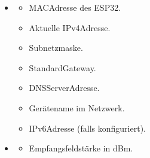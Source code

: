 \documentclass[letterpaper,10pt,english]{sphinxmanual}
\begin{document}
\sphinxAtStartPar
{}
\begin{itemize}
\item {} \begin{description}
\begin{itemize}
\item {} 
\sphinxAtStartPar
{}  \textendash{} MAC\sphinxhyphen{}Adresse des ESP32.

\item {} 
\sphinxAtStartPar
{}  \textendash{} Aktuelle IPv4\sphinxhyphen{}Adresse.

\item {} 
\sphinxAtStartPar
{}  \textendash{} Subnetzmaske.

\item {} 
\sphinxAtStartPar
{}  \textendash{} Standard\sphinxhyphen{}Gateway.

\item {} 
\sphinxAtStartPar
{}  \textendash{} DNS\sphinxhyphen{}Server\sphinxhyphen{}Adresse.

\item {} 
\sphinxAtStartPar
{}  \textendash{} Gerätename im Netzwerk.

\item {} 
\sphinxAtStartPar
{}  \textendash{} IPv6\sphinxhyphen{}Adresse (falls konfiguriert).

\end{itemize}

\end{description}

\item {} \begin{description}
\begin{itemize}
\item {} 
\sphinxAtStartPar
{}  \textendash{} Empfangsfeldstärke in dBm.


\end{itemize}
\end{description}
\end{itemize}
\end{document}
